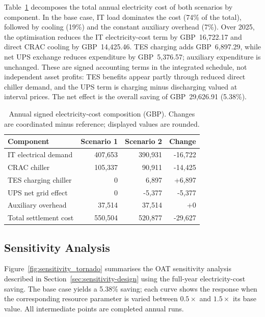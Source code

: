 \documentclass[lettersize,journal]{IEEEtran}
\newcommand{\rev}[1]{#1}
\begin{document}
\rev{Table~\ref{tab:cost-breakdown} decomposes the total annual electricity cost of both scenarios by component. In the base case, IT load dominates the cost (74\% of the total), followed by cooling (19\%) and the constant auxiliary overhead (7\%). Over 2025, the optimisation reduces the IT electricity-cost term by GBP~16,722.17 and direct CRAC cooling by GBP~14,425.46. TES charging adds GBP~6,897.29, while net UPS exchange reduces expenditure by GBP~5,376.57; auxiliary expenditure is unchanged. These are signed accounting terms in the integrated schedule, not independent asset profits: TES benefits appear partly through reduced direct chiller demand, and the UPS term is charging minus discharging valued at interval prices. The net effect is the overall saving of GBP~29,626.91 (5.38\%).}

\begin{table}[htbp]
\centering\small
\caption{Annual signed electricity-cost composition (GBP). Changes are coordinated minus reference; displayed values are rounded.}\label{tab:cost-breakdown}
\begin{tabular}{@{}lrrr@{}}\toprule
Component & Scenario 1 & Scenario 2 & Change \\\midrule
IT electrical demand & 407,653 & 390,931 & -16,722 \\
CRAC chiller & 105,337 & 90,911 & -14,425 \\
TES charging chiller & 0 & 6,897 & +6,897 \\
UPS net grid effect & 0 & -5,377 & -5,377 \\
Auxiliary overhead & 37,514 & 37,514 & +0 \\
Total settlement cost & 550,504 & 520,877 & -29,627 \\
\bottomrule\end{tabular}
\end{table}

\subsection{\rev{Sensitivity Analysis}}\label{sec:sensitivity}
\rev{Figure~\ref{fig:sensitivity_tornado} summarises the OAT sensitivity analysis described in Section~\ref{sec:sensitivity-design} using the full-year electricity-cost saving. The base case yields a 5.38\% saving; each curve shows the response when the corresponding resource parameter is varied between $0.5\times$ and $1.5\times$ its base value. All intermediate points are completed annual runs.}
\end{document}
